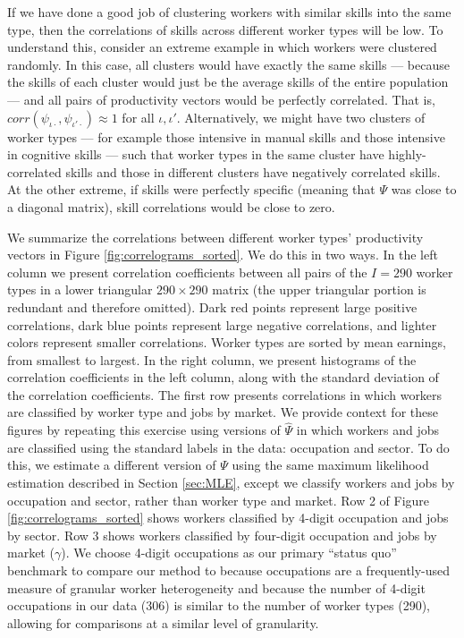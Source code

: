 \documentclass[12pt]{article}
\def\g{\gamma}
\def\i{\iota}
\theoremstyle{definition}
\theoremstyle{plain}
\begin{document}
If we have done a good job of clustering workers with similar skills into the same type, then the correlations of skills across different worker types will be low. To understand this, consider an extreme example in which workers were clustered randomly. In this case, all clusters would have exactly the same skills --- because the skills of each cluster would just be the average skills of the entire population --- and all pairs of productivity vectors would be perfectly correlated. That is, $corr(\psi_{\i\cdot},\psi_{\i'\cdot}) \approx 1$ for all $\i,\i'$.  Alternatively, we might have two clusters of worker types --- for example those intensive in manual skills and those intensive in cognitive skills --- such that worker types in the same cluster have highly-correlated skills and those in different clusters have  negatively correlated skills. At the other extreme, if skills were perfectly specific (meaning that $\Psi$ was close to a diagonal matrix), skill correlations would be close to zero. 


We summarize the correlations between different worker types' productivity vectors in Figure \ref{fig:correlograms_sorted}. We do this in two ways. In the left column we present correlation coefficients between all pairs of the $I=290$ worker types in a lower triangular $290\times 290$ matrix (the upper triangular portion is redundant and therefore omitted). Dark red points represent large positive correlations, dark blue points represent large negative correlations, and lighter colors represent smaller correlations. Worker types are sorted by mean earnings, from smallest to largest. In the right column, we present histograms of the correlation coefficients in the left column, along with the standard deviation of the correlation coefficients. The first row presents correlations in which workers are classified by worker type and jobs by market. We provide context for these figures by repeating this exercise using versions of $\hat \Psi$ in which workers and jobs are classified using the standard labels in the data: occupation and sector. To do this, we estimate a different version of $\Psi$ using the same maximum likelihood estimation described in Section \ref{sec:MLE}, except we classify workers and jobs by occupation and sector, rather than worker type and market. Row 2 of Figure \ref{fig:correlograms_sorted} shows workers classified by 4-digit occupation and jobs by sector. Row 3 shows workers classified by four-digit occupation and jobs by market ($\g$). We choose 4-digit occupations as our primary ``status quo'' benchmark to compare our method to because occupations are a frequently-used measure of granular worker heterogeneity and because the number of 4-digit occupations in our data (306) is similar to the number of worker types (290), allowing for comparisons at a similar level of granularity.
\end{document}
